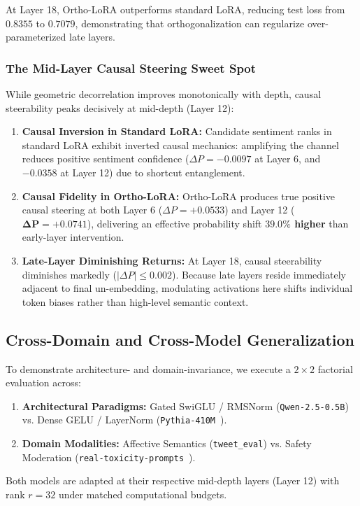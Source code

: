 \documentclass[10pt,twocolumn,letterpaper]{article}
\begin{document}
At Layer 18, Ortho-LoRA outperforms standard LoRA, reducing test loss from $0.8355$ to $0.7079$, demonstrating that orthogonalization can regularize over-parameterized late layers.

\subsubsection{The Mid-Layer Causal Steering Sweet Spot}
While geometric decorrelation improves monotonically with depth, causal steerability peaks decisively at mid-depth (Layer 12):
\begin{enumerate}
    \item \textbf{Causal Inversion in Standard LoRA:} Candidate sentiment ranks in standard LoRA exhibit inverted causal mechanics: amplifying the channel reduces positive sentiment confidence ($\Delta P = -0.0097$ at Layer 6, and $-0.0358$ at Layer 12) due to shortcut entanglement.
    \item \textbf{Causal Fidelity in Ortho-LoRA:} Ortho-LoRA produces true positive causal steering at both Layer 6 ($\Delta P = +0.0533$) and Layer 12 ($\bm{\Delta P = +0.0741}$), delivering an effective probability shift \textbf{$39.0\%$ higher} than early-layer intervention.
    \item \textbf{Late-Layer Diminishing Returns:} At Layer 18, causal steerability diminishes markedly ($|\Delta P| \le 0.002$). Because late layers reside immediately adjacent to final un-embedding, modulating activations here shifts individual token biases rather than high-level semantic context.
\end{enumerate}

\subsection{Cross-Domain and Cross-Model Generalization}
\label{subsec:ablation_universality}

To demonstrate architecture- and domain-invariance, we execute a $2 \times 2$ factorial evaluation across:
\begin{enumerate}
    \item \textbf{Architectural Paradigms:} Gated SwiGLU / RMSNorm (\texttt{Qwen-2.5-0.5B}) vs. Dense GELU / LayerNorm (\texttt{Pythia-410M}~\cite{biderman2023pythia}).
    \item \textbf{Domain Modalities:} Affective Semantics (\texttt{tweet\_eval}) vs. Safety Moderation (\texttt{real-toxicity-prompts}~\cite{gehman2020realtoxicityprompts}).
\end{enumerate}
Both models are adapted at their respective mid-depth layers (Layer 12) with rank $r=32$ under matched computational budgets.
\end{document}

